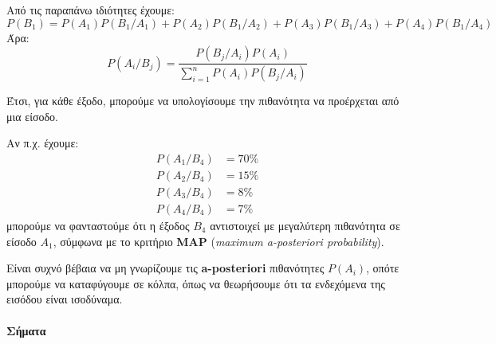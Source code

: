 \documentclass[11pt,a4paper,notitlepage,fleqn,draft]{article}
\begin{document}
	Από τις παραπάνω ιδιότητες έχουμε:
	\[
	P(B_1) = P(A_1)P(B_1/A_1)
	+P(A_2)P(B_1/A_2)
	+P(A_3)P(B_1/A_3)
	+P(A_4)P(B_1/A_4)
	\]
	Άρα:
	\[
		P(A_i/B_j) = \frac{P(B_j/A_i)P(A_i)}{
			\sum_{i=1}^n P(A_i)P(B_j/A_i)
			}
	\]
	
	Έτσι, για κάθε έξοδο, μπορούμε να υπολογίσουμε την πιθανότητα
	να προέρχεται από μια είσοδο.
	
	Αν π.χ. έχουμε: \begin{align*}
		P(A_1/B_4) &= 70\% \\
		P(A_2/B_4) &= 15\% \\
		P(A_3/B_4) &= 8\% \\
		P(A_4/B_4) &= 7\%
	\end{align*}
	μπορούμε να φανταστούμε ότι η έξοδος \( B_4 \) αντιστοιχεί με
	μεγαλύτερη πιθανότητα σε είσοδο \( A_1 \), σύμφωνα με το κριτήριο
	\textbf{MAP} (\textit{maximum a-posteriori probability}).
	
	Είναι συχνό βέβαια να μη γνωρίζουμε τις \textbf{a-posteriori}
	πιθανότητες \( P(A_i) \), οπότε μπορούμε να καταφύγουμε σε κόλπα,
	όπως να θεωρήσουμε ότι τα ενδεχόμενα της εισόδου είναι ισοδύναμα.
	
	\paragraph{Σήματα}
	\hspace{0pt}
	
\end{document}
